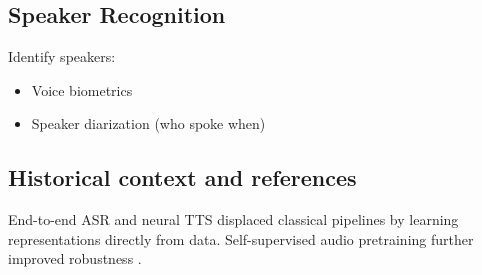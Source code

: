 \subsection{Speaker Recognition}

Identify speakers:
\begin{itemize}
    \item Voice biometrics
    \item Speaker diarization (who spoke when)
\end{itemize}

\subsection{Historical context and references}

End-to-end ASR and neural TTS displaced classical pipelines by learning representations directly from data. Self-supervised audio pretraining further improved robustness \textcite{Prince2023}.


